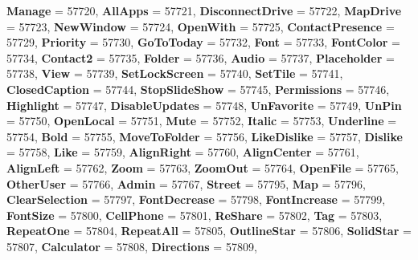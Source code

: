 \begin{DoxyCompactItemize}
\newline
{\bfseries Manage} = 57720, 
{\bfseries All\+Apps} = 57721, 
{\bfseries Disconnect\+Drive} = 57722, 
{\bfseries Map\+Drive} = 57723, 
\newline
{\bfseries New\+Window} = 57724, 
{\bfseries Open\+With} = 57725, 
{\bfseries Contact\+Presence} = 57729, 
{\bfseries Priority} = 57730, 
\newline
{\bfseries Go\+To\+Today} = 57732, 
{\bfseries Font} = 57733, 
{\bfseries Font\+Color} = 57734, 
{\bfseries Contact2} = 57735, 
\newline
{\bfseries Folder} = 57736, 
{\bfseries Audio} = 57737, 
{\bfseries Placeholder} = 57738, 
{\bfseries View} = 57739, 
\newline
{\bfseries Set\+Lock\+Screen} = 57740, 
{\bfseries Set\+Tile} = 57741, 
{\bfseries Closed\+Caption} = 57744, 
{\bfseries Stop\+Slide\+Show} = 57745, 
\newline
{\bfseries Permissions} = 57746, 
{\bfseries Highlight} = 57747, 
{\bfseries Disable\+Updates} = 57748, 
{\bfseries Un\+Favorite} = 57749, 
\newline
{\bfseries Un\+Pin} = 57750, 
{\bfseries Open\+Local} = 57751, 
{\bfseries Mute} = 57752, 
{\bfseries Italic} = 57753, 
\newline
{\bfseries Underline} = 57754, 
{\bfseries Bold} = 57755, 
{\bfseries Move\+To\+Folder} = 57756, 
{\bfseries Like\+Dislike} = 57757, 
\newline
{\bfseries Dislike} = 57758, 
{\bfseries Like} = 57759, 
{\bfseries Align\+Right} = 57760, 
{\bfseries Align\+Center} = 57761, 
\newline
{\bfseries Align\+Left} = 57762, 
{\bfseries Zoom} = 57763, 
{\bfseries Zoom\+Out} = 57764, 
{\bfseries Open\+File} = 57765, 
\newline
{\bfseries Other\+User} = 57766, 
{\bfseries Admin} = 57767, 
{\bfseries Street} = 57795, 
{\bfseries Map} = 57796, 
\newline
{\bfseries Clear\+Selection} = 57797, 
{\bfseries Font\+Decrease} = 57798, 
{\bfseries Font\+Increase} = 57799, 
{\bfseries Font\+Size} = 57800, 
\newline
{\bfseries Cell\+Phone} = 57801, 
{\bfseries Re\+Share} = 57802, 
{\bfseries Tag} = 57803, 
{\bfseries Repeat\+One} = 57804, 
\newline
{\bfseries Repeat\+All} = 57805, 
{\bfseries Outline\+Star} = 57806, 
{\bfseries Solid\+Star} = 57807, 
{\bfseries Calculator} = 57808, 
\newline
{\bfseries Directions} = 57809, 

\end{DoxyCompactItemize}
